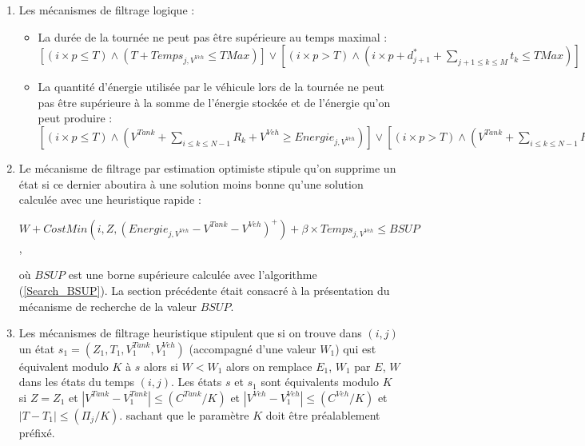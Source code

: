 \begin{enumerate}
	\item Les mécanismes de filtrage logique :
	\begin{itemize} [label=$\square$]
		\item La durée de la tournée ne peut pas être supérieure au temps maximal : $[(i \times p \leq T) \land (T + Temps_{j,V^{Veh}}  \leq TMax)] \lor [(i \times p > T ) \land ( i \times p + d^*_{j+1} + \sum_{j+1\leq k \leq M}t_k \leq TMax)]$
		\item La quantité d'énergie utilisée par le véhicule lors de la tournée ne peut pas être supérieure à la somme de l'énergie stockée et de l'énergie qu'on peut produire : $[(i \times p \leq T ) \land ( V^{Tank} + \sum_{i \leq k \leq N-1}R_k +V^{Veh} \geq Energie_{j,V^{Veh}} )] \lor [(i \times p > T ) \land (V^{Tank} + \sum_{i \leq k \leq N-1}R_k +V^{Veh} \geq \varepsilon^*_{j+1} +\sum_{j+1 \leq k \leq M}e_k )]$
	\end{itemize}
\item Le mécanisme de filtrage par estimation optimiste stipule qu'on supprime un état si ce dernier aboutira à une solution \og moins bonne\fg{} qu'une solution calculée avec une heuristique rapide : 

$W + CostMin(i,Z,(Energie_{j,V^{Veh}}-V^{Tank}-V^{Veh})^+) + \beta \times Temps_{j,V^{Veh}}  \leq BSUP $,

 où $BSUP$ est une borne supérieure calculée avec l'algorithme (\ref{Search_BSUP}). La section précédente était consacré à la présentation du mécanisme de recherche de la valeur $BSUP$.
 
 \item Les mécanismes de filtrage heuristique stipulent que si on trouve dans $(i,j)$ un état $s_1=(Z_1, T_1, V^{Tank}_1, V^{Veh}_1)$ (accompagné d'une valeur $W_1$) qui est équivalent modulo $K$ à $s$ alors si $W<W_1$ alors on remplace $E_1$, $W_1$ par $E$, $W$ dans les états du temps $(i,j)$. Les états $s$ et $s_1$ sont équivalents modulo $K$ si $Z =Z_1$ et $|V^{Tank} - V^{Tank}_1| \leq (C^{Tank} / K)$ et $|V^{Veh} - V^{Veh}_1| \leq (C^{Veh} / K)$ et $|T - T_1| \leq (\Pi_j / K)$. sachant que le paramètre $K$ doit être préalablement préfixé.
\end{enumerate}

